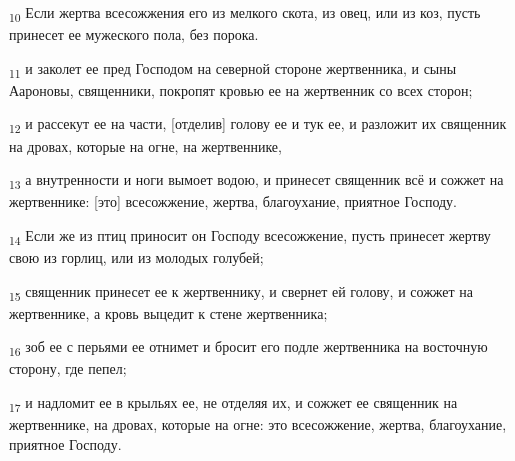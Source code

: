 \begin{tcolorbox}
\textsubscript{10} Если жертва всесожжения его из мелкого скота, из овец, или из коз, пусть принесет ее мужеского пола, без порока.
\end{tcolorbox}
\begin{tcolorbox}
\textsubscript{11} и заколет ее пред Господом на северной стороне жертвенника, и сыны Аароновы, священники, покропят кровью ее на жертвенник со всех сторон;
\end{tcolorbox}
\begin{tcolorbox}
\textsubscript{12} и рассекут ее на части, [отделив] голову ее и тук ее, и разложит их священник на дровах, которые на огне, на жертвеннике,
\end{tcolorbox}
\begin{tcolorbox}
\textsubscript{13} а внутренности и ноги вымоет водою, и принесет священник всё и сожжет на жертвеннике: [это] всесожжение, жертва, благоухание, приятное Господу.
\end{tcolorbox}
\begin{tcolorbox}
\textsubscript{14} Если же из птиц приносит он Господу всесожжение, пусть принесет жертву свою из горлиц, или из молодых голубей;
\end{tcolorbox}
\begin{tcolorbox}
\textsubscript{15} священник принесет ее к жертвеннику, и свернет ей голову, и сожжет на жертвеннике, а кровь выцедит к стене жертвенника;
\end{tcolorbox}
\begin{tcolorbox}
\textsubscript{16} зоб ее с перьями ее отнимет и бросит его подле жертвенника на восточную сторону, где пепел;
\end{tcolorbox}
\begin{tcolorbox}
\textsubscript{17} и надломит ее в крыльях ее, не отделяя их, и сожжет ее священник на жертвеннике, на дровах, которые на огне: это всесожжение, жертва, благоухание, приятное Господу.
\end{tcolorbox}
